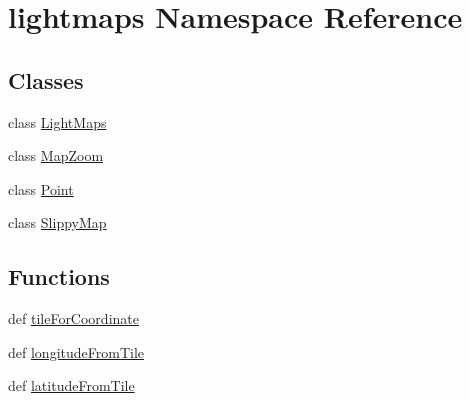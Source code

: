 \hypertarget{namespacelightmaps}{}\section{lightmaps Namespace Reference}
\label{namespacelightmaps}
\subsection*{Classes}
\begin{DoxyCompactItemize}
\item 
class \hyperlink{classlightmaps_1_1LightMaps}{Light\+Maps}
\item 
class \hyperlink{classlightmaps_1_1MapZoom}{Map\+Zoom}
\item 
class \hyperlink{classlightmaps_1_1Point}{Point}
\item 
class \hyperlink{classlightmaps_1_1SlippyMap}{Slippy\+Map}
\end{DoxyCompactItemize}
\subsection*{Functions}
\begin{DoxyCompactItemize}
\item 
def \hyperlink{namespacelightmaps_a38ffe72b8ec6687c07d64b6da150aec9}{tile\+For\+Coordinate}
\item 
def \hyperlink{namespacelightmaps_ab2bfdc6f4f1371838cf481f9c2aafaec}{longitude\+From\+Tile}
\item 
def \hyperlink{namespacelightmaps_ac5438a946e9193f5357b6402705248a9}{latitude\+From\+Tile}
\end{DoxyCompactItemize}

